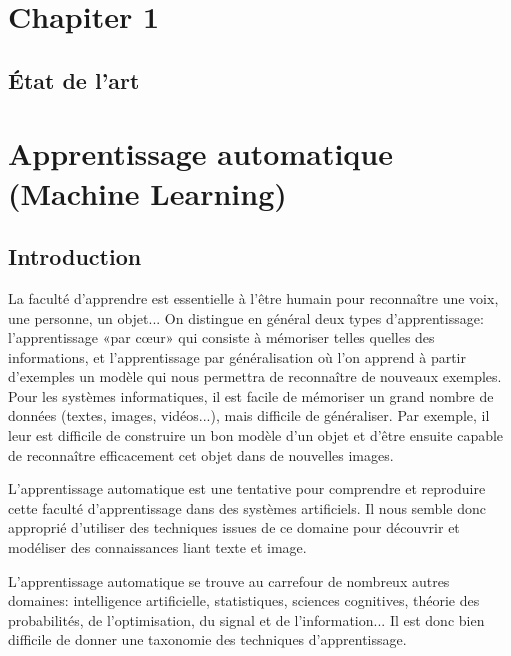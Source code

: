 \documentclass[12pt]{article}
\begin{document}
\tableofcontents
\thispagestyle{empty}
\newpage


\listoffigures
{}
\cleardoublepage

\listoftables
{}
\cleardoublepage

\setcounter{page}{1}
\section*{\Huge{Chapiter 1}}
\subsection*{\huge{\' Etat de l'art}}
\newpage
\section{Apprentissage automatique (Machine Learning)}
\subsection{Introduction}
La faculté d'apprendre est essentielle à l'être humain pour reconnaître une voix, une personne, un objet... On distingue en général deux types d'apprentissage: l'apprentissage «par cœur» qui consiste à mémoriser telles quelles des informations, et l'apprentissage par généralisation où l'on apprend à partir d'exemples un modèle qui nous permettra de reconnaître de nouveaux exemples. Pour les systèmes informatiques, il est facile de mémoriser un grand nombre de données (textes, images, vidéos...), mais difficile de généraliser. Par exemple, il leur est difficile de construire un bon modèle d'un objet et d'être ensuite capable de reconnaître efficacement cet objet dans de nouvelles images.

L'apprentissage automatique est une tentative pour comprendre et reproduire cette faculté d'apprentissage dans des systèmes artificiels. Il nous semble donc approprié d'utiliser des techniques issues de ce domaine pour découvrir et modéliser des connaissances liant texte et image.

L'apprentissage automatique se trouve au carrefour de nombreux autres domaines: intelligence artificielle, statistiques, sciences cognitives, théorie des probabilités, de l'optimisation, du signal et de l'information... Il est donc bien difficile de donner une taxonomie des techniques d'apprentissage.
\end{document}
